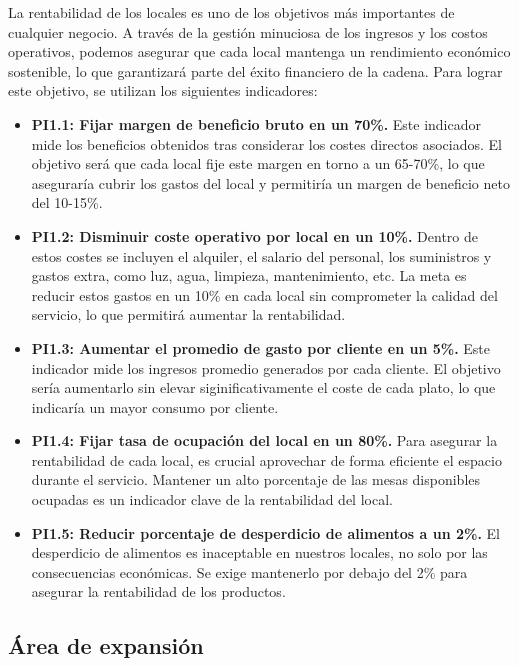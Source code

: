 \documentclass[12pt]{opticajnl}
\begin{document}
La rentabilidad de los locales es uno de los objetivos más importantes de cualquier negocio. A través de la gestión minuciosa de los ingresos y los costos operativos, podemos asegurar que cada local mantenga un rendimiento económico sostenible, lo que garantizará parte del éxito financiero de la cadena. Para lograr este objetivo, se utilizan los siguientes indicadores:

\begin{itemize}
    \item \textbf{PI1.1: Fijar margen de beneficio bruto en un 70\%.} Este indicador mide los beneficios obtenidos tras considerar los costes directos asociados. El objetivo será que cada local fije este margen en torno a un 65-70\%, lo que aseguraría cubrir los gastos del local y permitiría un margen de beneficio neto del 10-15\%. 
    \item \textbf{PI1.2: Disminuir coste operativo por local en un 10\%.} Dentro de estos costes se incluyen el alquiler, el salario del personal, los suministros y gastos extra, como luz, agua, limpieza, mantenimiento, etc. La meta es reducir estos gastos en un 10\% en cada local sin comprometer la calidad del servicio, lo que permitirá aumentar la rentabilidad.
    \item \textbf{PI1.3: Aumentar el promedio de gasto por cliente en un 5\%.} Este indicador mide los ingresos promedio generados por cada cliente. El objetivo sería aumentarlo sin elevar siginificativamente el coste de cada plato, lo que indicaría un mayor consumo por cliente. 
    \item \textbf{PI1.4: Fijar tasa de ocupación del local en un 80\%.} Para asegurar la rentabilidad de cada local, es crucial aprovechar de forma eficiente el espacio durante el servicio. Mantener un alto porcentaje de las mesas disponibles ocupadas es un indicador clave de la rentabilidad del local.
    \item \textbf{PI1.5: Reducir porcentaje de desperdicio de alimentos a un 2\%.} El desperdicio de alimentos es inaceptable en nuestros locales, no solo por las consecuencias económicas. Se exige mantenerlo por debajo del 2\% para asegurar la rentabilidad de los productos. 
\end{itemize}






\subsection{Área de expansión}
\end{document}
